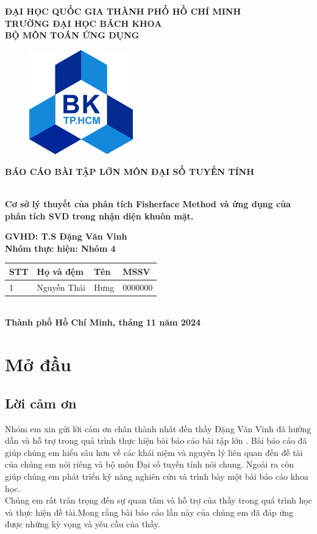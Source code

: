 \documentclass[a4paper,12pt]{extarticle}
\begin{document}
\begin{titlepage}
    \centering
    {\textbf{ĐẠI HỌC QUỐC GIA THÀNH PHỐ HỒ CHÍ MINH} \\   
    {\textbf{TRƯỜNG ĐẠI HỌC BÁCH KHOA}} \\   
    {\textbf{BỘ MÔN TOÁN ỨNG DỤNG}} \\
\begin{figure}[h]
    \centering
    \includegraphics[width=0.4\textwidth]{img/Bach khoa.png}
\end{figure}
    { \textbf{BÁO CÁO BÀI TẬP LỚN MÔN ĐẠI SỐ TUYẾN TÍNH}} \\
    \hrulefill \\}
    {\huge \textbf{Cơ sở lý thuyết của phân tích Fisherface Method và ứng dụng của phân tích SVD trong nhận diện khuôn mặt.}} \\
    \vspace{0.5cm}
    
    { \textbf{GVHD: T.S Đặng Văn Vinh}} \\
    {\textbf{Nhóm thực hiện: Nhóm 4}}
    \vspace{1cm}

\begin{tabular}{|m{1cm}|m{3cm}|m{3cm}|m{2cm}|}
\hline
STT & Họ và đệm  & Tên &  MSSV \\ \hline
1 & Nguyễn Thái & Hưng & 0000000 \\ \hline
\end{tabular}
\vspace{5cm} \\
\textbf{Thành phố Hồ Chí Minh, tháng 11 năm 2024}
\end{titlepage}
\tableofcontents
\newpage

\section{Mở đầu} 
\subsection{Lời cảm ơn}
Nhóm em xin gửi lời cảm ơn chân thành nhất đến thầy Đặng Văn Vinh đã hướng dẫn và hỗ trợ trong quá trình thực hiện bài báo cáo bài tập lớn . Bài báo cáo đã giúp chúng em hiểu sâu hơn về các khái niệm và nguyên lý liên quan đến đề tài của chúng em nói riêng và bộ môn Đại số tuyến tính nói chung. Ngoài ra còn giúp chúng em phát triển kỹ năng nghiên cứu và trình bày một bài báo cáo khoa học.\\
Chúng em rất trân trọng đến sự quan tâm và hỗ trợ của thầy trong quá trình học và thực hiện đề tài.Mong rằng bài báo cáo lần này của chúng em đã đáp ứng được những kỳ vọng và yêu cầu của thầy.
\end{document}
